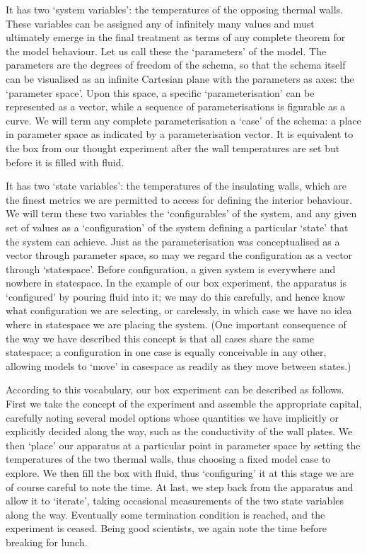 \documentclass[letterpaper,10pt,english]{jupyterBook}
\begin{document}
\sphinxAtStartPar
It has two ‘system variables’: the temperatures of the opposing thermal walls. These variables can be assigned any of infinitely many values and must ultimately emerge in the final treatment as terms of any complete theorem for the model behaviour. Let us call these the ‘parameters’ of the model. The parameters are the degrees of freedom of the schema, so that the schema itself can be visualised as an infinite Cartesian plane with the parameters as axes: the ‘parameter space’. Upon this space, a specific ‘parameterisation’ can be represented as a vector, while a sequence of parameterisations is figurable as a curve. We will term any complete parameterisation a ‘case’ of the schema: a place in parameter space as indicated by a parameterisation vector. It is equivalent to the box from our thought experiment after the wall temperatures are set but before it is filled with fluid.

\sphinxAtStartPar
It has two ‘state variables’: the temperatures of the insulating walls, which are the finest metrics we are permitted to access for defining the interior behaviour. We will term these two variables the ‘configurables’ of the system, and any given set of values as a ‘configuration’ of the system defining a particular ‘state’ that the system can achieve. Just as the parameterisation was conceptualised as a vector through parameter space, so may we regard the configuration as a vector through ‘state\sphinxhyphen{}space’. Before configuration, a given system is everywhere and nowhere in state\sphinxhyphen{}space. In the example of our box experiment, the apparatus is ‘configured’ by pouring fluid into it; we may do this carefully, and hence know what configuration we are selecting, or carelessly, in which case we have no idea where in state\sphinxhyphen{}space we are placing the system. (One important consequence of the way we have described this concept is that all cases share the same state\sphinxhyphen{}space; a configuration in one case is equally conceivable in any other, allowing models to ‘move’ in case\sphinxhyphen{}space as readily as they move between states.)

\sphinxAtStartPar
According to this vocabulary, our box experiment can be described as follows. First we take the concept of the experiment and assemble the appropriate capital, carefully noting several model options whose quantities we have implicitly or explicitly decided along the way, such as the conductivity of the wall plates. We then ‘place’ our apparatus at a particular point in parameter space by setting the temperatures of the two thermal walls, thus choosing a fixed model case to explore. We then fill the box with fluid, thus ‘configuring’ it \sphinxhyphen{} at this stage we are of course careful to note the time.  At last, we step back from the apparatus and allow it to ‘iterate’, taking occasional measurements of the two state variables along the way. Eventually some termination condition is reached, and the experiment is ceased. Being good scientists, we again note the time before breaking for lunch.
\end{document}
